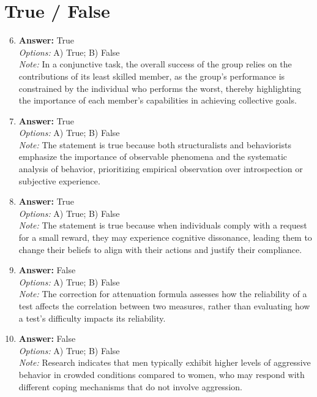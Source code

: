 \documentclass[12pt]{article}
\begin{document}
\section*{True / False}
\begin{enumerate}[label=\arabic*.]
\setcounter{enumi}{5}
\item \textbf{Answer:} True
\\ \textit{Options:} A) True; B) False
\\ \textit{Note:} In a conjunctive task, the overall success of the group relies on the contributions of its least skilled member, as the group's performance is constrained by the individual who performs the worst, thereby highlighting the importance of each member's capabilities in achieving collective goals.
\item \textbf{Answer:} True
\\ \textit{Options:} A) True; B) False
\\ \textit{Note:} The statement is true because both structuralists and behaviorists emphasize the importance of observable phenomena and the systematic analysis of behavior, prioritizing empirical observation over introspection or subjective experience.
\item \textbf{Answer:} True
\\ \textit{Options:} A) True; B) False
\\ \textit{Note:} The statement is true because when individuals comply with a request for a small reward, they may experience cognitive dissonance, leading them to change their beliefs to align with their actions and justify their compliance.
\item \textbf{Answer:} False
\\ \textit{Options:} A) True; B) False
\\ \textit{Note:} The correction for attenuation formula assesses how the reliability of a test affects the correlation between two measures, rather than evaluating how a test's difficulty impacts its reliability.
\item \textbf{Answer:} False
\\ \textit{Options:} A) True; B) False
\\ \textit{Note:} Research indicates that men typically exhibit higher levels of aggressive behavior in crowded conditions compared to women, who may respond with different coping mechanisms that do not involve aggression.
\end{enumerate}
\end{document}
